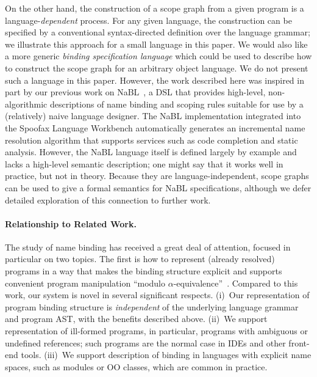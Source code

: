 On the other hand, 
the construction of a scope graph from a given program is a
language-\emph{dependent} process. For any given language, the
construction can be specified by a conventional syntax-directed
definition over the language grammar; 
we illustrate this approach for a small language in this paper.  
We would also like a more
generic \emph{binding specification language} which could be
used to describe how to 
construct the scope graph for an arbitrary object language.
We do not present such a language in this paper. However, the
work described here was inspired in part by our previous work on 
NaBL~\cite{KonatKWV12}, a DSL that provides high-level,
non-algorithmic descriptions of name binding and scoping rules 
suitable for use by a  (relatively) naive language designer.
The NaBL implementation integrated into the Spoofax Language Workbench
\cite{KatsV10} automatically generates an incremental name resolution
algorithm that supports services such as code completion and static
analysis. However, the NaBL language itself is defined largely by
example and lacks a high-level semantic description; one might say that
it works well in practice, but not in theory. Because they are
language-independent, scope graphs can be used to give a formal
semantics for NaBL specifications, although we defer detailed
exploration of this connection to further work. 

\paragraph{Relationship to Related Work.}

The study of name binding has received a great deal of attention,
focused in particular on two topics.
The first is how to represent 
(already resolved) programs in a way that makes the binding
structure explicit and supports 
convenient program manipulation ``modulo
$\alpha$-equivalence''~\cite{deBruijn72,DBLP:conf/pldi/PfenningE88,Chargueraud12,GabbayP02,Cheney05a}.
Compared to this work, our system is novel in several significant respects.
(i)~Our representation of program binding structure is {\it independent}
of the underlying language grammar and program AST, with the
benefits described above.
(ii)~We support representation of ill-formed programs, 
in particular, programs with ambiguous or undefined references; such programs
are the normal case in IDEs and other front-end tools. 
(iii)~We support description of binding in languages with
explicit name spaces, such as modules or OO classes, which
are common in practice.  

